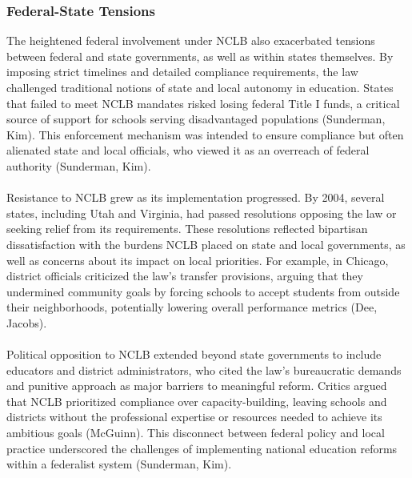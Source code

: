 \documentclass[11pt]{extarticle}
\begin{document}
\subsubsection{Federal-State Tensions}
The heightened federal involvement under NCLB also exacerbated tensions between federal and state governments, as well as within states themselves. By imposing strict timelines and detailed compliance requirements, the law challenged traditional notions of state and local autonomy in education. States that failed to meet NCLB mandates risked losing federal Title I funds, a critical source of support for schools serving disadvantaged populations (Sunderman, Kim). 
This enforcement mechanism was intended to ensure compliance but often alienated state and local officials, who viewed it as an overreach of federal authority (Sunderman, Kim).\\
\\
Resistance to NCLB grew as its implementation progressed. By 2004, several states, including Utah and Virginia, had passed resolutions opposing the law or seeking relief from its requirements. These resolutions reflected bipartisan dissatisfaction with the burdens NCLB placed on state and local governments, as well as concerns about its impact on local priorities. For example, in Chicago, district officials criticized the law’s transfer provisions, arguing that they undermined community goals by forcing schools to accept students from outside their neighborhoods, potentially lowering overall performance metrics (Dee, Jacobs).\\
\\
Political opposition to NCLB extended beyond state governments to include educators and district administrators, who cited the law’s bureaucratic demands and punitive approach as major barriers to meaningful reform. Critics argued that NCLB prioritized compliance over capacity-building, leaving schools and districts without the professional expertise or resources needed to achieve its ambitious goals (McGuinn). This disconnect between federal policy and local practice underscored the challenges of implementing national education reforms within a federalist system (Sunderman, Kim).
\end{document}
